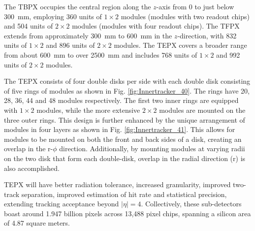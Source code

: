 The TBPX occupies the central region along the \( z \)-axis from 0 to just below 300~mm, employing 360 units of \( 1 \times 2 \) modules (modules with two readout chips) and 504 units of \( 2 \times 2 \) modules (modules with four readout chips). The TFPX extends from approximately 300~mm to 600~mm in the \( z \)-direction, with 832 units of \( 1 \times 2 \) and 896 units of \( 2 \times 2 \) modules. The TEPX covers a broader range from about 600~mm to over 2500~mm and includes 768 units of \( 1 \times 2 \) and 992 units of \( 2 \times 2 \) modules.

The TEPX consists of four double disks per side with each double disk consisting of five rings of modules as shown in Fig. \ref{fig:Innertracker_40}. The rings have 20, 28, 36, 44 and 48 modules respectively.  The first two inner rings are equipped with \(1 \times 2\) modules, while the more extensive \(2 \times 2\) modules are mounted on the three outer rings. This design is further enhanced by the unique arrangement of modules in four layers as shown in Fig.   \ref{fig:Innertracker_41}. This allows for modules to be mounted on both the front and back sides of a disk, creating an overlap in the r-\(\phi\) direction. Additionally, by mounting modules at varying radii on the two disk that form each double-disk, overlap in the radial direction (r) is also accomplished. 



TEPX will have better radiation tolerance, increased granularity, improved two-track separation, improved estimation of hit rate and statistical precision, extending tracking acceptance beyond $|\eta|=4$. Collectively, these sub-detectors boast around 1.947 billion pixels across 13,488 pixel chips, spanning a silicon area of 4.87 square meters.


